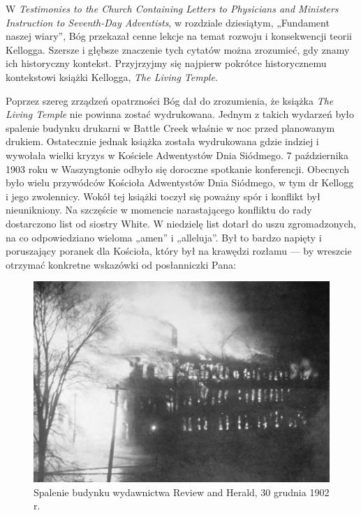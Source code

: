 
W \textit{Testimonies to the Church Containing Letters to Physicians and Ministers Instruction to Seventh-Day Adventists}, w rozdziale dziesiątym, „Fundament naszej wiary”, Bóg przekazał cenne lekcje na temat rozwoju i konsekwencji teorii Kellogga. Szersze i głębsze znaczenie tych cytatów można zrozumieć, gdy znamy ich historyczny kontekst. Przyjrzyjmy się najpierw pokrótce historycznemu kontekstowi książki Kellogga, \textit{The Living Temple}.

Poprzez szereg zrządzeń opatrzności Bóg dał do zrozumienia, że książka \textit{The Living Temple} nie powinna zostać wydrukowana. Jednym z takich wydarzeń było spalenie budynku drukarni w Battle Creek właśnie w noc przed planowanym drukiem. Ostatecznie jednak książka została wydrukowana gdzie indziej i wywołała wielki kryzys w Kościele Adwentystów Dnia Siódmego. 7 października 1903 roku w Waszyngtonie odbyło się doroczne spotkanie konferencji. Obecnych było wielu przywódców Kościoła Adwentystów Dnia Siódmego, w tym dr Kellogg i jego zwolennicy. Wokół tej książki toczył się poważny spór i konflikt był nieunikniony. Na szczęście w momencie narastającego konfliktu do rady dostarczono list od siostry White. W niedzielę list dotarł do uszu zgromadzonych, na co odpowiedziano wieloma „amen” i „alleluja”. Był to bardzo napięty i poruszający poranek dla Kościoła, który był na krawędzi rozłamu — by wreszcie otrzymać konkretne wskazówki od posłanniczki Pana:

\begin{figure}[h]
    \centering
    \includegraphics[width=1\linewidth]{images/review-and-herlad.jpg}
    \caption*{Spalenie budynku wydawnictwa Review and Herald, 30 grudnia 1902 r.}
    \label{fig:review-and-herald}
\end{figure}

